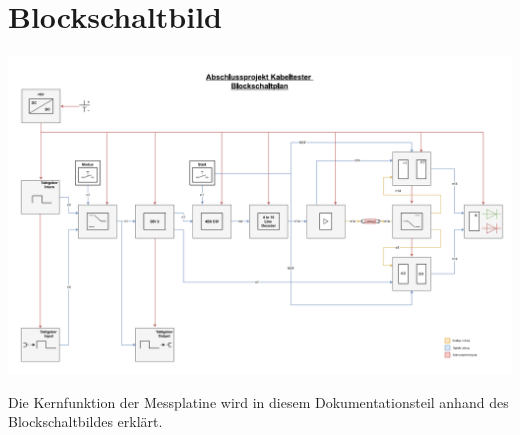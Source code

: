 \section{Blockschaltbild}
	
\begin{center}
\includegraphics[width=22cm, angle=-90]{Bilder/Blockschaltplan.png}
\end{center}

\newpage

\begin{center}
Die Kernfunktion der Messplatine wird in diesem Dokumentationsteil anhand des Blockschaltbildes erklärt. 
\end{center}

